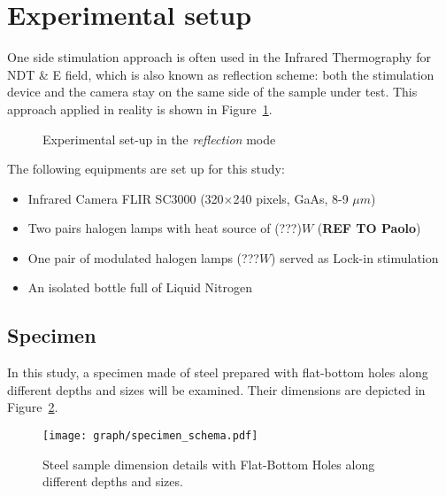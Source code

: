 \documentclass[]{spie}  %
\begin{document}
\section{Experimental setup} %
\label{sec:experimental_setup}
One side stimulation approach is often used in the Infrared Thermography for NDT \& E field, which is also known as reflection scheme: both the stimulation device and the camera stay on the same side of the sample under test. This approach applied in reality is shown in Figure~\ref{Exp_setup}.

\begin{figure}[ht]
   \centering
   \caption{Experimental set-up in the \textit{reflection} mode}
   \label{Exp_setup}
\end{figure}

The following equipments are set up for this study:
\begin{itemize}
   \item Infrared Camera FLIR SC3000 (320$\times$240 pixels, GaAs, 8-9 $\mu m$)
   \item Two pairs halogen lamps with heat source of (???)$W$ (\textbf{REF TO Paolo})
   \item One pair of modulated halogen lamps (???$W$) served as Lock-in stimulation
   \item An isolated bottle full of Liquid Nitrogen
\end{itemize}

\subsection{Specimen} %
\label{sub:specimen}
In this study, a specimen made of steel prepared with flat-bottom holes along different depths and sizes will be examined. Their dimensions are depicted in Figure~\ref{specimen}.
   \begin{figure}[ht]
   \centering   
   \texttt{[image: graph/specimen\_schema.pdf]}
   \caption{Steel sample dimension details with Flat-Bottom Holes along different depths and sizes.}
    \label{specimen} 
   \end{figure}  
\end{document}
